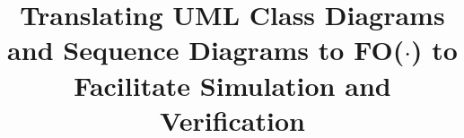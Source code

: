 \documentclass[conference]{IEEEtran}
\begin{document}
%
\title{Translating UML Class Diagrams and Sequence Diagrams to FO($\cdot$) to Facilitate Simulation and Verification}


\author{
}

% 








\maketitle
\end{document}
